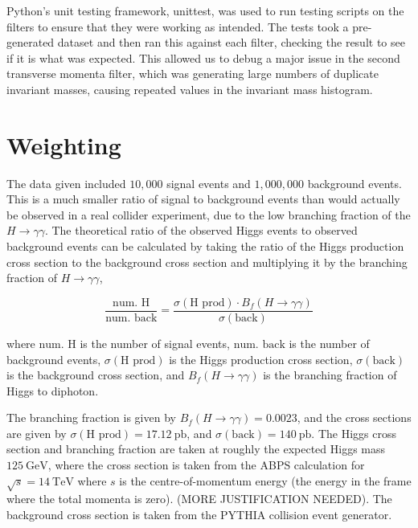 \documentclass[11pt]{amsart}
\begin{document}
\begin{multicols}{2}
Python's unit testing framework, unittest, was used to run testing scripts on the filters to ensure that they were working as intended. The tests took a pre-generated dataset and then ran this against each filter, checking the result to see if it is what was expected. This allowed us to debug a major issue in the second transverse momenta filter, which was generating large numbers of duplicate invariant masses, causing repeated values in the invariant mass histogram.

\section{Weighting}

The data given included $10,000$ signal events and $1,000,000$ background events. This is a much smaller ratio of signal to background events than would actually be observed in a real collider experiment, due to the low branching fraction of the $H \to \gamma\gamma$. The theoretical ratio of the observed Higgs events to observed background events can be calculated by taking the ratio of the Higgs production cross section to the background cross section and multiplying it by the branching fraction of $H \to \gamma\gamma$,

\begin{equation}
  \label{eq:weighting}
  \frac{\text{num. H}}{\text{num. back}} = \frac{\sigma{\left(\text{H prod}\right)} \cdot B_f\left(H\to\gamma\gamma\right)}{\sigma{\left(\text{back}\right)}}
\end{equation}

where $\text{num. H}$ is the number of signal events, $\text{num. back}$ is the number of background events, $\sigma{\left(\text{H prod}\right)}$ is the Higgs production cross section, $\sigma{\left(\text{back}\right)}$ is the background cross section, and $B_f\left(H\to\gamma\gamma\right)$ is the branching fraction of Higgs to diphoton.

The branching fraction is given by $B_f\left(H\to\gamma\gamma\right) = 0.0023$, and the cross sections are given by $\sigma{\left(\text{H prod}\right)} = \SI{17.12}{\pico\barn}$, and $\sigma{\left(\text{back}\right)} = \SI{140}{\pico\barn}$. The Higgs cross section and branching fraction are taken at roughly the expected Higgs mass $\SI{125}{\giga\electronvolt}$, \cite{Higgs} where the cross section is taken from the ABPS calculation for $\sqrt{s} = \SI{14}{\tera\electronvolt}$ where $s$ is the centre-of-momentum energy (the energy in the frame where the total momenta is zero). \cite{HiggsCross1} \cite{COMframe} (MORE JUSTIFICATION NEEDED). The background cross section is taken from the PYTHIA collision event generator.


\end{multicols}
\end{document}
